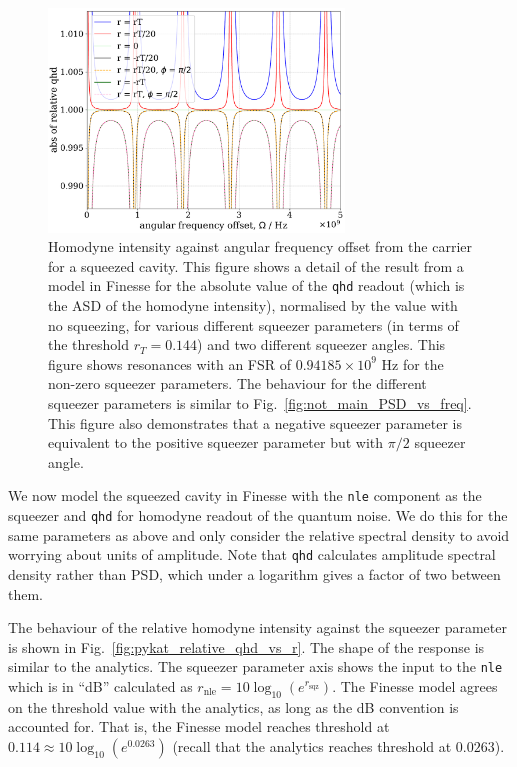 \documentclass[aps,pra,superscriptaddress,reprint,nofootinbib]{revtex4-1}
\newcommand{\code}[1]{\texttt{#1}}
\begin{document}
\begin{figure}
	\begin{center}
	\includegraphics[width=0.7\textwidth]{figures/pykat_relative_qhd_vs_freq.pdf}
	\end{center}
	\caption{Homodyne intensity against angular frequency offset from the carrier for a squeezed cavity. This figure shows a detail of the result from a model in Finesse for the absolute value of the \code{qhd} readout (which is the ASD of the homodyne intensity), normalised by the value with no squeezing, for various different squeezer parameters (in terms of the threshold $r_T = 0.144$) and two different squeezer angles. This figure shows resonances with an FSR of $0.94185 \times 10^9$ Hz for the non-zero squeezer parameters. The behaviour for the different squeezer parameters is similar to Fig.~\ref{fig:not_main_PSD_vs_freq}. This figure also demonstrates that a negative squeezer parameter is equivalent to the positive squeezer parameter but with $\pi/2$ squeezer angle.}
	\label{fig:pykat_relative_qhd_vs_freq}
\end{figure}

We now model the squeezed cavity in Finesse with the \code{nle} component as the squeezer and \code{qhd} for homodyne readout of the quantum noise. We do this for the same parameters as above and only consider the relative spectral density to avoid worrying about units of amplitude. Note that \code{qhd} calculates amplitude spectral density rather than PSD, which under a logarithm gives a factor of two between them.


The behaviour of the relative homodyne intensity against the squeezer parameter is shown in Fig.~\ref{fig:pykat_relative_qhd_vs_r}. The shape of the response is similar to the analytics. The squeezer parameter axis shows the input to the \code{nle} which is in ``dB'' calculated as $r_{\mathrm{nle}} = 10 \log_{10}(e^{r_\mathrm{sqz}})$. The Finesse model agrees on the threshold value with the analytics, as long as the dB convention is accounted for. That is, the Finesse model reaches threshold at $0.114 \approx 10 \log_{10}(e^{0.0263})$ (recall that the analytics reaches threshold at $0.0263$).
\end{document}
